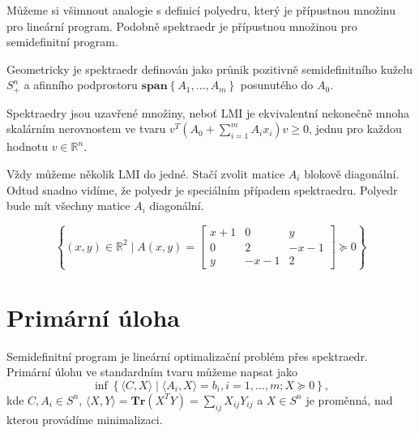 Můžeme si všimnout analogie s definicí polyedru, který je přípustnou množinu pro lineární program. Podobně spektraedr je přípustnou množinou pro semidefinitní program.

Geometricky je spektraedr definován jako průnik pozitivně semidefinitního kuželu $S_+^n$ a afinního podprostoru $\textbf{span}\left\{ A_1, \dots, A_m \right\}$ posunutého do $A_0$.

Spektraedry jsou uzavřené množiny, neboť LMI je ekvivalentní nekonečně mnoha skalárním nerovnostem ve tvaru $v^T(A_0 + \sum_{i=1}^m A_ix_i)v \geq 0$, jednu pro každou hodnotu $v \in \mathbb{R}^n$.

Vždy můžeme několik LMI  do jedné. Stačí zvolit matice $A_i$ blokově diagonální. Odtud snadno vidíme, že polyedr je speciálním případem spektraedru. Polyedr bude mít všechny matice $A_i$ diagonální.

\begin{pr}
    $$
        \left\{ (x, y) \in \mathbb{R}^2 \mid A(x,y) =
        \begin{bmatrix}
            x + 1 & 0      & y \\
            0     & 2      & -x - 1 \\
            y     & -x - 1 & 2
        \end{bmatrix}
        \succeq 0 \right\}
    $$
\end{pr}

\section{Primární úloha}

Semidefinitní program je lineární optimalizační problém přes spektraedr. Primární úlohu ve standardním tvaru můžeme napsat jako
\begin{equation}\tag{SDP-P}
    \inf \left\{ \langle C, X \rangle \mid \langle A_i, X \rangle = b_i, i=1, \dots, m; X \succeq 0 \right\},
    \label{eq:SDP-P}
\end{equation}
kde $C, A_i \in S^n$, $\langle X, Y \rangle = \textbf{Tr}(X^T Y) = \sum_{ij} X_{ij}Y_{ij}$ a $X \in S^n$ je proměnná, nad kterou provádíme minimalizaci.

